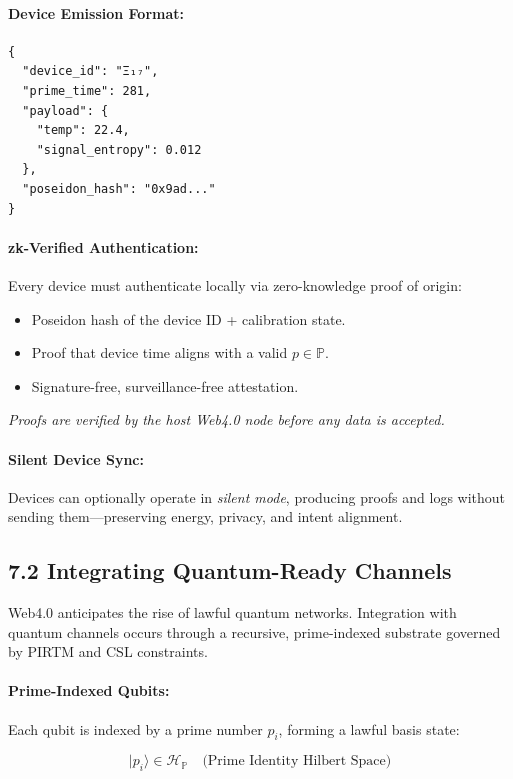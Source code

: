 \documentclass[12]{amsart}
\theoremstyle{plain}
\begin{document}
\paragraph{Device Emission Format:}
\begin{verbatim}
{
  "device_id": "Ξ₁₇",
  "prime_time": 281,
  "payload": {
    "temp": 22.4,
    "signal_entropy": 0.012
  },
  "poseidon_hash": "0x9ad..."
}
\end{verbatim}

\paragraph{zk-Verified Authentication:}
Every device must authenticate locally via zero-knowledge proof of origin:

\begin{itemize}
  \item Poseidon hash of the device ID + calibration state.
  \item Proof that device time aligns with a valid $p \in \mathbb{P}$.
  \item Signature-free, surveillance-free attestation.
\end{itemize}

\textit{Proofs are verified by the host Web4.0 node before any data is accepted.}

\paragraph{Silent Device Sync:}
Devices can optionally operate in \textit{silent mode}, producing proofs and logs without sending them—preserving energy, privacy, and intent alignment.

\subsection{7.2 Integrating Quantum-Ready Channels}
\label{subsec:quantum_channels}

Web4.0 anticipates the rise of lawful quantum networks. Integration with quantum channels occurs through a recursive, prime-indexed substrate governed by PIRTM and CSL constraints.

\paragraph{Prime-Indexed Qubits:}
Each qubit is indexed by a prime number $p_i$, forming a lawful basis state:

\[
|p_i\rangle \in \mathcal{H}_{\mathbb{P}} \quad \text{(Prime Identity Hilbert Space)}
\]
\end{document}
